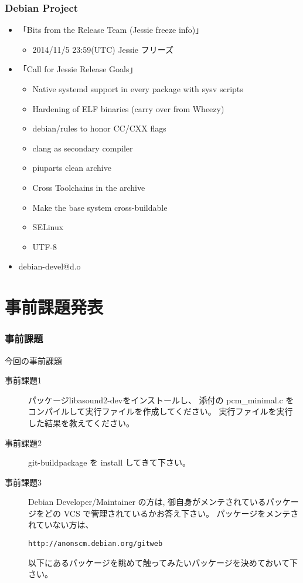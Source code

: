 \documentclass[cjk,dvipdfmx,10pt,compress,%
hyperref={bookmarks=true,bookmarksnumbered=true,bookmarksopen=false,%
colorlinks=false,%
pdftitle={第 77 回 関西 Debian 勉強会},%
pdfauthor={倉敷・のがた・佐々木・かわだ・八津尾},%
pdfsubject={資料},%
}]{beamer}
\begin{document}
\begin{frame}[fragile]
  \frametitle{Debian Project}
  \begin{itemize}
  \item 「Bits from the Release Team (Jessie freeze info)」
    \begin{itemize}
    \item 2014/11/5 23:59(UTC) Jessie フリーズ
    \end{itemize}
  \item 「Call for Jessie Release Goals」
    \begin{itemize}
    \item Native systemd support in every package with sysv scripts
    \item Hardening of ELF binaries (carry over from Wheezy)
    \item debian/rules to honor CC/CXX flags
    \item clang as secondary compiler
    \item piuparts clean archive
    \item Cross Toolchains in the archive
    \item Make the base system cross-buildable
    \item SELinux
    \item UTF-8
    \end{itemize}
  \item debian-devel@d.o
  \end{itemize}
\end{frame}


\section{事前課題発表}


\begin{frame}[fragile]
  \frametitle{事前課題}
  \begin{block}{今回の事前課題}
    \begin{description}
    \item[事前課題1]
      パッケージlibasound2-devをインストールし、
      添付の pcm\_minimal.c をコンパイルして実行ファイルを作成してください。
      実行ファイルを実行した結果を教えてください。

    \item[事前課題2]
      git-buildpackage を install してきて下さい。

    \item[事前課題3]
      Debian Developer/Maintainer の方は, 御自身がメンテされているパッケージをどの VCS で管理されているかお答え下さい。
      パッケージをメンテされていない方は、
      \begin{center}
        {\tt{http://anonscm.debian.org/gitweb}}
      \end{center}
      以下にあるパッケージを眺めて触ってみたいパッケージを決めておいて下さい。
    \end{description}
  \end{block}
\end{frame}
\end{document}
